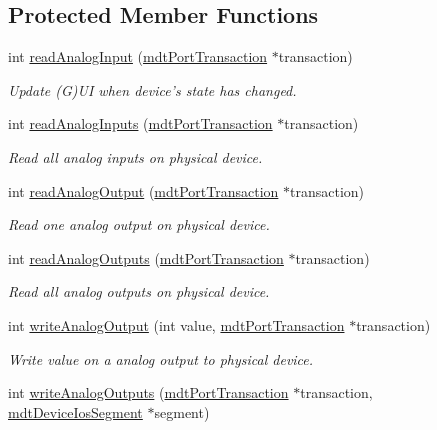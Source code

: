 \subsection*{Protected Member Functions}
\begin{DoxyCompactItemize}
\item 
int \hyperlink{classmdt_device_modbus_aa2a024793ae2a5e81c7e92260a70cd9e}{readAnalogInput} (\hyperlink{classmdt_port_transaction}{mdtPortTransaction} $\ast$transaction)
\begin{DoxyCompactList}\small\item\em Update (G)UI when device's state has changed. \end{DoxyCompactList}\item 
int \hyperlink{classmdt_device_modbus_a846af6dbf80bbf747f3f966420ef6f92}{readAnalogInputs} (\hyperlink{classmdt_port_transaction}{mdtPortTransaction} $\ast$transaction)
\begin{DoxyCompactList}\small\item\em Read all analog inputs on physical device. \end{DoxyCompactList}\item 
int \hyperlink{classmdt_device_modbus_a30c815cbe5e603e8114dcbc09849e322}{readAnalogOutput} (\hyperlink{classmdt_port_transaction}{mdtPortTransaction} $\ast$transaction)
\begin{DoxyCompactList}\small\item\em Read one analog output on physical device. \end{DoxyCompactList}\item 
int \hyperlink{classmdt_device_modbus_ae02dd44f1d873fcc15ff75d781b62b0b}{readAnalogOutputs} (\hyperlink{classmdt_port_transaction}{mdtPortTransaction} $\ast$transaction)
\begin{DoxyCompactList}\small\item\em Read all analog outputs on physical device. \end{DoxyCompactList}\item 
int \hyperlink{classmdt_device_modbus_ac63297a31205759622f341525c34251f}{writeAnalogOutput} (int value, \hyperlink{classmdt_port_transaction}{mdtPortTransaction} $\ast$transaction)
\begin{DoxyCompactList}\small\item\em Write value on a analog output to physical device. \end{DoxyCompactList}\item 
int \hyperlink{classmdt_device_modbus_aa09d1682bef4bbc08b59b20110e613ff}{writeAnalogOutputs} (\hyperlink{classmdt_port_transaction}{mdtPortTransaction} $\ast$transaction, \hyperlink{classmdt_device_ios_segment}{mdtDeviceIosSegment} $\ast$segment)

\end{DoxyCompactItemize}

